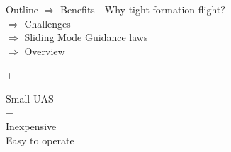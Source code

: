 \documentclass[12pt,svgnames,table,draft=false]{beamer}
\begin{document}
\usebackgroundtemplate{
}



\usebackgroundtemplate{}

\begin{frame}{Outline}
  $\Rightarrow$ Benefits - Why tight formation flight?\\
  \vspace{1em}
  $\Rightarrow$ Challenges \\
  \vspace{1em}
  $\Rightarrow$ Sliding Mode Guidance laws \\
  \vspace{1em}
  $\Rightarrow$ Overview \\
\end{frame}

\begin{frame}{+}
\vspace{7em}
\centering
	\begin{tcolorbox}[width=.8\textwidth,colback={gray!10!}]  
	\centering
	\Large
	Small UAS \\
	= \\
	Inexpensive \\
	Easy to operate
	\end{tcolorbox}  
	
\end{frame}
\end{document}
